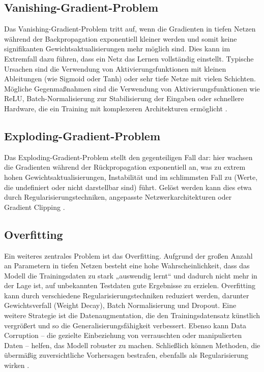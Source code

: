 \subsection{Vanishing-Gradient-Problem}

Das Vanishing-Gradient-Problem tritt auf, wenn die Gradienten in tiefen Netzen während der Backpropagation exponentiell kleiner werden und somit keine signifikanten Gewichtsaktualisierungen mehr möglich sind. Dies kann im Extremfall dazu führen, dass ein Netz das Lernen vollständig einstellt. Typische Ursachen sind die Verwendung von Aktivierungsfunktionen mit kleinen Ableitungen (wie Sigmoid oder Tanh) oder sehr tiefe Netze mit vielen Schichten. Mögliche Gegenmaßnahmen sind die Verwendung von Aktivierungsfunktionen wie \acrshort{ReLU}, Batch-Normalisierung zur Stabilisierung der Eingaben oder schnellere Hardware, die ein Training mit komplexeren Architekturen ermöglicht \cite{Alzubaidi2021}.  

\subsection{Exploding-Gradient-Problem}

Das Exploding-Gradient-Problem stellt den gegenteiligen Fall dar: hier wachsen die Gradienten während der Rückpropagation exponentiell an, was zu extrem hohen Gewichtsaktualisierungen, Instabilität und im schlimmsten Fall zu  (Werte, die undefiniert oder nicht darstellbar sind) führt. Gelöst werden kann dies etwa durch Regularisierungstechniken, angepasste Netzwerkarchitekturen oder Gradient Clipping \cite{Alzubaidi2021}.  

\subsection{Overfitting}

Ein weiteres zentrales Problem ist das Overfitting. Aufgrund der großen Anzahl an Parametern in tiefen Netzen besteht eine hohe Wahrscheinlichkeit, dass das Modell die Trainingsdaten zu stark „auswendig lernt“ und dadurch nicht mehr in der Lage ist, auf unbekannten Testdaten gute Ergebnisse zu erzielen. Overfitting kann durch verschiedene Regularisierungstechniken reduziert werden, darunter Gewichtsverfall (Weight Decay), Batch Normalisierung und Dropout. Eine weitere Strategie ist die Datenaugmentation, die den Trainingsdatensatz künstlich vergrößert und so die Generalisierungsfähigkeit verbessert. Ebenso kann Data Corruption – die gezielte Einbeziehung von verrauschten oder manipulierten Daten – helfen, das Modell robuster zu machen. Schließlich können Methoden, die übermäßig zuversichtliche Vorhersagen bestrafen, ebenfalls als Regularisierung wirken \cite{Alzubaidi2021}.  

